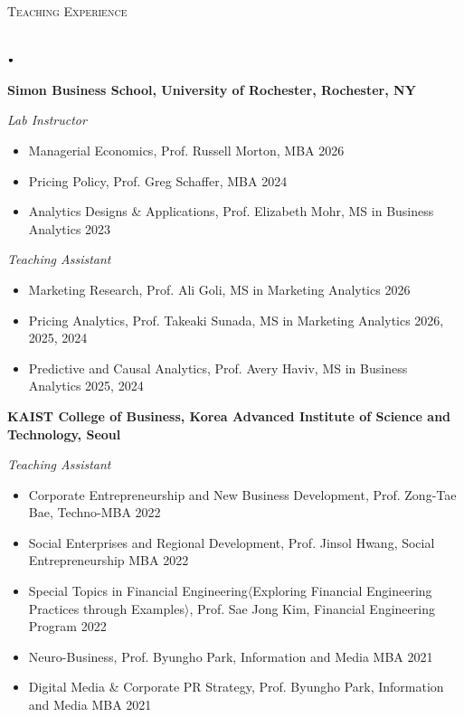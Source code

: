 \documentclass[11pt]{article}
\newcommand{\lineunder}{\vspace*{-8pt} \\ \hspace*{-18pt} \hrulefill \\}
\newcommand{\header}[1]{{\hspace*{-15pt}\vspace*{6pt} \textsc{#1}} \vspace*{-6pt} \lineunder}
\newcommand{\lbt}{\,\begin{picture}(-1,1)(-1,-3)\circle*{3}\end{picture}\ }
\newenvironment{achievements}{
    \begin{list}{$\lbt$}{
        \topsep 0pt
        \itemsep 0pt
        \addtolength{\leftmargin}{-0.1in}
    }
}
{
    \vspace*{4pt}
    \end{list}
}
\begin{document}
\header{\Large{Teaching Experience}}
\vspace{2mm}
\begin{achievements}
\item \textbf{Simon Business School, University of Rochester, Rochester, NY}\\
\begin{normalsize}
    \textit{Lab Instructor}
\end{normalsize}
  \begin{itemize}
      \item[-] Managerial Economics, Prof. Russell Morton, MBA \hfill{} 2026
      \item[-] Pricing Policy, Prof. Greg Schaffer, MBA \hfill{} 2024
      \item[-] Analytics Designs \& Applications, Prof. Elizabeth Mohr, MS in Business Analytics \hfill{} 2023
  \end{itemize}
\begin{normalsize}
    \textit{Teaching Assistant}
\end{normalsize}
  \begin{itemize}
      \item[-] Marketing Research, Prof. Ali Goli, MS in Marketing Analytics \hfill{} 2026
      \item[-] Pricing Analytics, Prof. Takeaki Sunada, MS in Marketing Analytics \hfill{} 2026, 2025, 2024
      \item[-] Predictive and Causal Analytics, Prof. Avery Haviv, MS in Business Analytics \hfill 2025, 2024
  \end{itemize}
\item \textbf{KAIST College of Business, Korea Advanced Institute of Science and Technology, Seoul}
\\
\begin{normalsize}
    \textit{Teaching Assistant}
\end{normalsize}
  \begin{itemize}
      \item[-] Corporate Entrepreneurship and New Business Development, Prof. Zong-Tae Bae, Techno-MBA \hfill{} 2022
      \item[-] Social Enterprises and Regional Development, Prof. Jinsol Hwang, Social Entrepreneurship MBA \hfill{} 2022
      \item[-] Special Topics in Financial Engineering$\langle$Exploring Financial Engineering Practices through Examples$\rangle$, Prof. Sae Jong Kim, Financial Engineering Program \hfill{} 2022
      \item[-] Neuro-Business, Prof. Byungho Park, Information and Media MBA \hfill{} 2021
      \item[-] Digital Media \& Corporate PR Strategy, Prof. Byungho Park, Information and Media MBA \hfill{} 2021
  \end{itemize}
\end{achievements}
\bigskip
\end{document}

